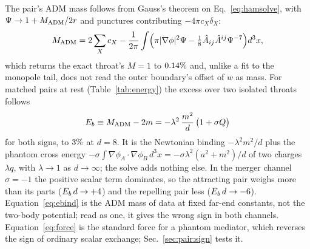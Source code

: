 \documentclass[twocolumn,floatfix,aps,prd,superscriptaddress,nofootinbib,showkeys]{revtex4-2}
\begin{document}
The pair's ADM mass follows from Gauss's theorem on Eq.~\eqref{eq:hamsolve}, with $\Psi\to1+M_{\rm ADM}/2r$ and punctures contributing $-4\pi c_X\delta_X$:
\begin{equation}
M_{\rm ADM}=2\sum_X c_X-\frac1{2\pi}\int\Bigl(\pi|\nabla\phi|^2\Psi-\tfrac18\hat A_{ij}\hat A^{ij}\Psi^{-7}\Bigr)d^3x ,
\label{eq:madmvol}
\end{equation}
which returns the exact throat's $M=1$ to $0.14\%$ and, unlike a fit to the monopole tail, does not read the outer boundary's offset of $w$ as mass. For matched pairs at rest (Table~\ref{tab:energy}) the excess over two isolated throats follows
\begin{equation}
E_b\equiv M_{\rm ADM}-2m=-\lambda^2\,\frac{m^2}{d}\,\bigl(1+\sigma Q\bigr)
\label{eq:ebind}
\end{equation}
for both signs, to $3\%$ at $d=8$. It is the Newtonian binding $-\lambda^2m^2/d$ plus the phantom cross energy $-\sigma\!\int\nabla\phi_A\!\cdot\!\nabla\phi_B\,d^3x=-\sigma\lambda^2(a^2+m^2)/d$ of two charges $\lambda q$, with $\lambda\to1$ as $d\to\infty$; the solve adds nothing else. In the merger channel $\sigma=-1$ the positive scalar term dominates, so the attracting pair weighs more than its parts ($E_b\,d\to+4$) and the repelling pair less ($E_b\,d\to-6$). Equation~\eqref{eq:ebind} is the ADM mass of data at fixed far-end constants, not the two-body potential; read as one, it gives the wrong sign in both channels. Equation~\eqref{eq:force} is the standard force for a phantom mediator, which reverses the sign of ordinary scalar exchange; Sec.~\ref{sec:pair:sign} tests it.
\end{document}
